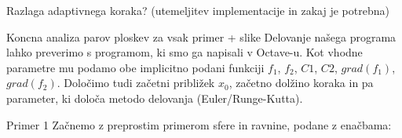 \documentclass{beamer}
\begin{document}
\begin{frame}{Razlaga adaptivnega koraka? (utemeljitev implementacije in zakaj je potrebna)}

\end{frame}

\begin{frame}{Koncna analiza parov ploskev za vsak primer + slike}
	Delovanje našega programa lahko preverimo s programom, ki smo ga napisali v Octave-u. Kot vhodne parametre mu podamo obe implicitno podani funkciji $f_{1}$, $f_{2}$, $C1$, $C2$, $grad(f_{1})$, $grad(f_{2})$. Določimo tudi začetni približek $x_{0}$, začetno dolžino koraka in pa parameter, ki določa metodo delovanja (Euler/Runge-Kutta).
\end{frame}

\begin{frame}{Primer 1}
	Začnemo z preprostim primerom sfere in ravnine, podane z enačbama:\\
	

\end{frame}
\end{document}
